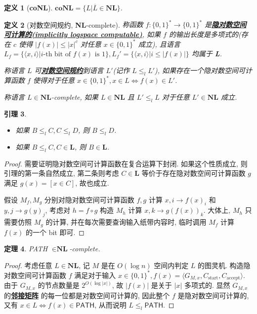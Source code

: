\documentclass[8pt]{article}
\theoremstyle{compact}
\newtheorem{theorem}{定理}[section]
\newtheorem{lemma}[theorem]{引理}
\newtheorem{definition}[theorem]{定义}
\def\obj#1{\textbf{\uline{#1}}}
\def\le{\leqslant}
\def\L{\textbf{L}}
\def\NL{\textbf{NL}}
\def\coNL{\textbf{coNL}}
\begin{document}
\begin{definition}[\coNL]
	$\coNL = \{L | \overline{L} \in \NL\}$.
\end{definition}

\begin{definition}[对数空间规约, \NL-complete]
	称函数 $f: \{0, 1\}^* \to \{0, 1\}^*$ 是\obj{隐对数空间可计算的(implicitly logspace computable)}, 如果 $f$ 的输出长度是多项式的(存在 $c$ 使得 $|f(x)| \le |x|^c$ 对任意 $x \in \{0, 1\}^*$ 成立), 且语言 $L_f = \{\langle x, i \rangle |i \text{-th bit of } f(x) \text{ is } 1\}, L_f' = \{\langle x, i \rangle | i \le |f(x)|\}$ 均属于 \L.

	称语言 $L$ 可\obj{对数空间规约}到语言 $L'$(记作 $L \le_l L'$), 如果存在一个隐对数空间可计算函数 $f$ 使得对于任意 $x \in \{0, 1\}^*, x \in L \Leftrightarrow f(x) \in L'$.

	称语言 $L \in \NL$-complete, 如果 $L \in \NL$ 且 $L' \le_l L$ 对于任意 $L' \in \NL$ 成立.
	
	\label{def_logspace}
\end{definition}
\begin{lemma}
	\begin{itemize}
		\item 如果 $B \le_l C, C \le_l D$, 则 $B \le_l D$.
		\item 如果 $B \le_l C, C \in \L$, 则 $B \in \L$.
	\end{itemize}
\end{lemma}
\begin{proof}
	需要证明隐对数空间可计算函数在复合运算下封闭. 如果这个性质成立, 则引理的第一条自然成立, 第二条则考虑 $C \in \L$ 等价于存在隐对数空间可计算函数 $g$ 满足 $g(x) = [x \in C]$, 故也成立.

	假设 $M_f, M_g$ 分别对隐对数空间可计算函数 $f, g$ 计算 $x, i \to f(x)_i$ 和 $y, j \to g(y)_j$, 考虑对 $h = f \circ g$ 构造 $M_h$ 计算 $x, k \to g(f(x))_k$. 大体上, $M_h$ 只需要仿照 $M_g$ 的计算, 并在每次需要查询输入纸带内容时, 临时调用 $M_f$ 计算 $f(x)$ 的一个 bit 即可.

\end{proof}
\begin{theorem}
	\textsf{PATH} $\in \NL$-complete.
	\label{path_nl_complete}
\end{theorem}
\begin{proof}
	考虑任意 $L \in \NL$, 记 $M$ 是在 $O(\log n)$ 空间内判定 $L$ 的图灵机. 构造隐对数空间可计算函数 $f$ 满足对于输入 $x \in \{0, 1\}^*, f(x) = \langle G_{M, x}, C_{\text{start}}, C_{\text{accept}} \rangle$. 由于 $G_{M, x}$ 的节点数量是 $2^{O(\log |x|)}$, 故 $|f(x)|$ 是关于 $|x|$ 多项式的. 显然 $G_{M, x}$ 的\obj{邻接矩阵} 的每一位都是对数空间可计算的, 因此整个 $f$ 是隐对数空间可计算的, 又有 $x \in L \Leftrightarrow f(x) \in \textsf{PATH}$, 从而说明 $L \le_l \textsf{PATH}$.
\end{proof}
\end{document}
